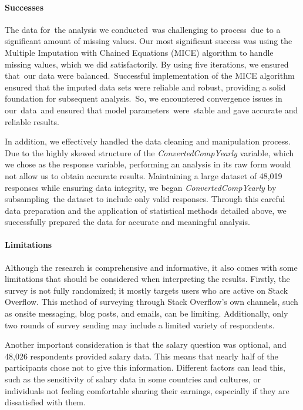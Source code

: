 \documentclass[
  12pt,
]{article}
\begin{document}
\hypertarget{successes}{%
\paragraph{Successes}\label{successes}}

The data for~the analysis we conducted~was challenging to process~due to
a significant amount of missing values. Our most significant success was
using the Multiple Imputation with Chained Equations (MICE) algorithm to
handle missing values, which we did satisfactorily. By using five
iterations, we ensured that~our data were balanced.~Successful
implementation of the MICE algorithm ensured that the imputed data sets
were reliable and robust, providing a solid foundation for subsequent
analysis.~So, we encountered convergence issues in our~data~and ensured
that model parameters~were~stable and gave accurate and reliable
results.

In addition, we effectively handled the data cleaning and manipulation
process. Due to the highly skewed structure of the
\emph{ConvertedCompYearly} variable, which we chose as the response
variable, performing an analysis in its raw form would not allow us to
obtain accurate results. Maintaining a large dataset of 48,019 responses
while ensuring data integrity, we began \emph{ConvertedCompYearly} by
subsampling~the dataset to include only valid responses. Through this
careful data preparation and the application of statistical methods
detailed above, we successfully prepared the data for accurate and
meaningful analysis.

\hypertarget{limitations}{%
\paragraph{Limitations}\label{limitations}}

Although the research is comprehensive and informative, it also comes
with some limitations that should be considered when interpreting the
results. Firstly, the survey is not fully randomized; it mostly targets
users who are active on Stack Overflow. This method of surveying through
Stack Overflow's own channels, such as onsite messaging, blog posts, and
emails, can be limiting. Additionally, only two rounds of survey sending
may include a limited variety of respondents.

Another important consideration is that the salary question was
optional, and 48,026 respondents provided salary data. This means that
nearly half of the participants chose not to give this information.
Different factors can lead this, such as the sensitivity of salary data
in some countries and cultures, or individuals not feeling comfortable
sharing their earnings, especially if they are dissatisfied with them.
\end{document}

